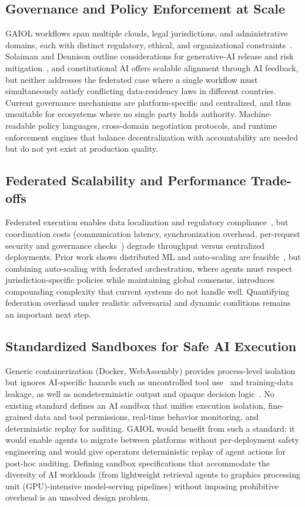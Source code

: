 \documentclass{iopjournal}
\begin{document}
\subsection{Governance and Policy Enforcement at Scale}

GAIOL workflows span multiple clouds, legal jurisdictions, and administrative domains, each with distinct regulatory, ethical, and organizational constraints~\cite{FM_Governance, FedLearn}. Solaiman and Dennison outline considerations for generative-AI release and risk mitigation~\cite{SafetyTaxonomy_FAccT23}, and constitutional AI offers scalable alignment through AI feedback, but neither addresses the federated case where a single workflow must simultaneously satisfy conflicting data-residency laws in different countries. Current governance mechanisms are platform-specific and centralized, and thus unsuitable for ecosystems where no single party holds authority. Machine-readable policy languages, cross-domain negotiation protocols, and runtime enforcement engines that balance decentralization with accountability are needed but do not yet exist at production quality.

\subsection{Federated Scalability and Performance Trade-offs}

Federated execution enables data localization and regulatory compliance~\cite{FedLearn}, but coordination costs (communication latency, synchronization overhead, per-request security and governance checks~\cite{NISTZTA}) degrade throughput versus centralized deployments. Prior work shows distributed ML and auto-scaling are feasible~\cite{FedML_MLSys22, Autoscaling_MAS}, but combining auto-scaling with federated orchestration, where agents must respect jurisdiction-specific policies while maintaining global consensus, introduces compounding complexity that current systems do not handle well. Quantifying federation overhead under realistic adversarial and dynamic conditions remains an important next step.

\subsection{Standardized Sandboxes for Safe AI Execution}
Generic containerization (Docker, WebAssembly) provides process-level isolation but ignores AI-specific hazards such as uncontrolled tool use~\cite{Toolformer} and training-data leakage, as well as nondeterministic output and opaque decision logic~\cite{Weidinger}. No existing standard defines an AI sandbox that unifies execution isolation, fine-grained data and tool permissions, real-time behavior monitoring, and deterministic replay for auditing. GAIOL would benefit from such a standard: it would enable agents to migrate between platforms without per-deployment safety engineering and would give operators deterministic replay of agent actions for post-hoc auditing. Defining sandbox specifications that accommodate the diversity of AI workloads (from lightweight retrieval agents to graphics processing unit (GPU)-intensive model-serving pipelines) without imposing prohibitive overhead is an unsolved design problem.
\end{document}
